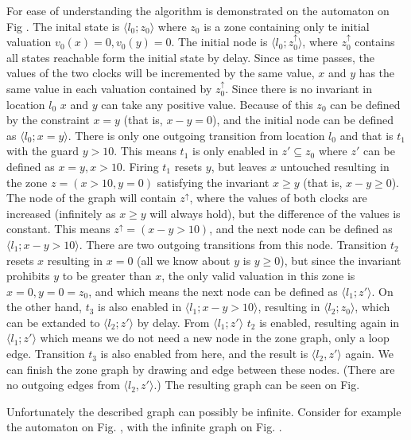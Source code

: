 For ease of understanding the algorithm is demonstrated on the automaton on Fig . The inital state is  $\langle l_0; z_0 \rangle$ where $z_0$ is a zone containing only te initial valuation $v_0(x)=0, v_0(y)=0$. The initial node is  $\langle l_0; z_0^\uparrow  \rangle$, where $z_0^\uparrow$ contains all states reachable form the initial state by delay. Since as time passes, the values of the two clocks will be incremented by the same value, $x$ and $y$ has the same value in each valuation contained by $z_0^\uparrow$. Since there is no invariant in location $l_0$ $x$ and $y$ can take any positive value. Because of this $z_0$ can be defined by the constraint $x=y$ (that is, $x-y = 0$), and the initial node can be defined as $\langle l_0; x=y  \rangle$.
There is only one outgoing transition from location $l_0$ and that is $t_1$ with the guard $y>10$. This means $t_1$ is only enabled in $z' \subseteq z_0$ where $z'$ can be defined as $x=y, x>10$. Firing $t_1$ resets $y$, but leaves $x$ untouched resulting in the zone $z=(x>10,y=0)$ satisfying the invariant $x \geq y$ (that is, $x-y \geq 0$). The node of the graph will contain $z^\uparrow$, where the values of both clocks are increased (infinitely as $x \geq y$ will always hold), but the difference of the values is constant. This means $z^\uparrow = (x-y>10)$, and the next node can be defined as $\langle l_1; x-y>10 \rangle$.
There are two outgoing transitions from this node. Transition $t_2$ resets $x$ resulting in $x=0$ (all we know about $y$ is $y \geq 0$), but since the invariant prohibits $y$ to be greater than $x$, the only valid valuation in this zone is $x=0, y=0 = z_0$, and which means the next node can be defined as $\langle l_1; z' \rangle$.
On the other hand, $t_3$ is also enabled in $\langle l_1; x-y>10 \rangle$, resulting in $\langle l_2; z_0 \rangle$, which can be extanded to $\langle l_2; z' \rangle$ by delay.
From $\langle l_1; z' \rangle$ $t_2$ is enabled, resulting again in $\langle l_1; z' \rangle$ which means we do not need a new node in the zone graph, only a loop edge. Transition $t_3$ is also enabled from here, and the result is $\langle l_2, z' \rangle$ again. We can finish the zone graph by drawing and edge between these nodes. (There are no outgoing edges from $\langle l_2, z' \rangle$.) The resulting graph can be seen on Fig. 



Unfortunately the described graph can possibly be infinite. Consider for example the automaton \cite{bengtsson2004timed} on Fig. , with the infinite graph on Fig. .

